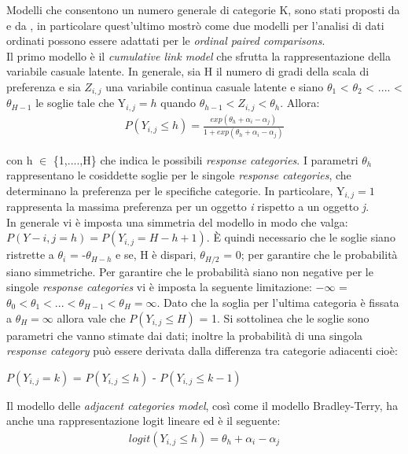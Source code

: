 Modelli che consentono un numero generale di categorie K, sono stati proposti da \autocite{tutz1986bradley} e da \autocite{bradley1952rank}, in particolare quest'ultimo mostrò come due modelli per l'analisi di dati ordinati possono essere adattati per le \emph{ordinal paired comparisons}.\\

Il primo modello è il \emph{cumulative link model} che sfrutta la rappresentazione della variabile casuale latente. In generale, sia H il numero di gradi della scala di preferenza e sia $Z_{i,j}$ una variabile continua casuale latente e siano $\theta_{1} $ < $\theta_{2}$ < .... < $\theta_{H-1}$ le soglie tale che Y$_{i,j} = h$ quando $\theta_{h-1} < Z_{i,j} < \theta_{h}$. Allora:
\begin{align}
	P(Y_{i,j}\leq h) =  \frac{exp(\theta_{h} + \alpha_{i} - \alpha_{j})}{1 + exp(\theta_{h} + \alpha_{i} - \alpha_{j})} \label{for:3.2.1}
\end{align}

con h $\in$ \{1,....,H\} che indica le possibili \emph{response categories}. I parametri $\theta_{h}$ rappresentano le cosiddette soglie per le singole \emph{response categories}, che determinano la preferenza per le specifiche categorie. In particolare, Y$_{i,j} = 1$ rappresenta la massima preferenza per un oggetto \textit{i} rispetto a un oggetto \textit{j}.\\
In generale vi è imposta una simmetria del modello in modo che valga: $P(Y-{i,j} = h) = P(Y_{i,j} = H - h + 1)$. È quindi necessario che le soglie siano ristrette a $\theta_{i}$ = -$\theta_{H-h}$ e se, H è dispari, $\theta_{H/2}$ = 0; per garantire che le probabilità siano simmetriche. Per garantire che le probabilità siano non negative per le singole \emph{response categories} vi è imposta la seguente limitazione: $-\infty$ = $\theta_{0} < \theta_{1} < ... < \theta_{H-1} < \theta_{H} = \infty$. Dato che la soglia per l'ultima categoria è fissata a $\theta_{H} = \infty$ allora vale che $P(Y_{i,j} \leq H)$ = 1. Si sottolinea che le soglie sono parametri che vanno stimate dai dati; inoltre la probabilità di una singola \emph{response category} può essere derivata dalla differenza tra categorie adiacenti cioè:
\begin{center}
	  $P(Y_{i,j} = k)$ = $P(Y_{i,j} \leq h)$ - $P(Y_{i,j} \leq k - 1)$
\end{center}

Il modello delle \emph{adjacent categories model}, così come il modello Bradley-Terry, ha anche una rappresentazione logit lineare ed è il seguente:
\begin{align}
	logit(Y_{i,j}\leq h) =  \theta_{h} + \alpha_i - \alpha_j 
\end{align}

